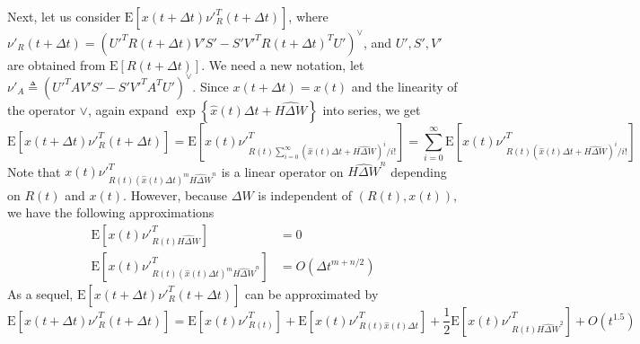 \documentclass[10pt]{article}
\newcommand{\expect}[1]{\ensuremath{\mathrm{E}\left[ #1 \right]}}
\begin{document}
Next, let us consider $\expect{x(t+\Delta t)\nu'^T_R(t+\Delta t)}$, where $\nu'_R(t+\Delta t) = (U'^TR(t+\Delta t)V'S'-S'V'^TR(t+\Delta t)^TU')^\vee$, and $U', S', V'$ are obtained from $\expect{R(t+\Delta t)}$.
We need a new notation, let $\nu'_A \triangleq (U'^TAV'S'-S'V'^TA^TU')^\vee$.
Since $x(t+\Delta t) = x(t)$ and the linearity of the operator $\vee$, again expand $\exp\left\{\hat{x}(t)\Delta t + \widehat{H\Delta W}\right\}$ into series, we get
\begin{equation}
	\expect{x(t+\Delta t)\nu'^T_R(t+\Delta t)} = \expect{x(t)\nu'^T_{R(t)\sum_{i=0}^{\infty}\left(\hat{x}(t)\Delta t + \widehat{H\Delta W}\right)^i/i!}} = \sum_{i=0}^{\infty}\expect{x(t)\nu'^T_{R(t)\left(\hat{x}(t)\Delta t + \widehat{H\Delta W}\right)^i/i!}}
\end{equation}
Note that $x(t)\nu'^T_{R(t)(\hat{x}(t)\Delta t)^m\widehat{H\Delta W}^n}$ is a linear operator on $\widehat{H\Delta W}^n$ depending on $R(t)$ and $x(t)$.
However, because $\Delta W$ is independent of $(R(t),x(t))$, we have the following approximations
\begin{align*}
	\expect{x(t)\nu'^T_{R(t)\widehat{H\Delta W}}} &= 0 \\
	\expect{x(t)\nu'^T_{R(t)(\hat{x}(t)\Delta t)^m\widehat{H\Delta W}^n}} &= O(\Delta t^{m+n/2})
\end{align*}
As a sequel, $\expect{x(t+\Delta t)\nu'^T_R(t+\Delta t)}$ can be approximated by
\begin{equation} \label{eqn:expectxvRNewAppro}
	\expect{x(t+\Delta t)\nu'^T_R(t+\Delta t)} = \expect{x(t)\nu'^T_{R(t)}} + \expect{x(t)\nu'^T_{R(t)\hat{x}(t)\Delta t}} + \frac{1}{2}\expect{x(t)\nu'^T_{R(t)\widehat{H\Delta W}^2}} + O(t^{1.5})
\end{equation}
\end{document}
